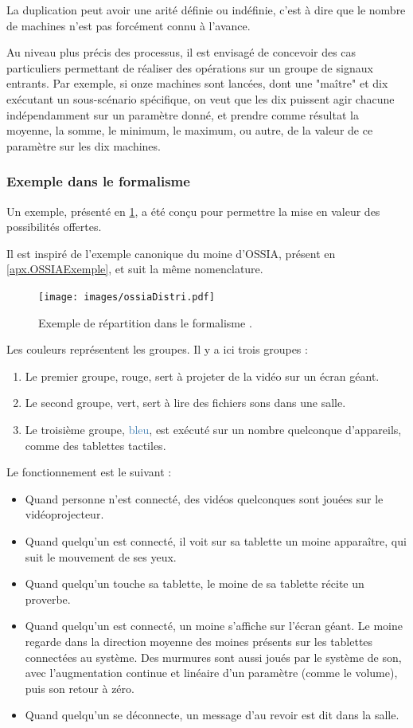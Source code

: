 La duplication peut avoir une arité définie ou indéfinie, c'est à dire que le nombre de machines n'est pas forcément connu à l'avance.

Au niveau plus précis des processus, il est envisagé de concevoir des cas particuliers permettant de réaliser des opérations sur un groupe de signaux entrants. Par exemple, si onze machines sont lancées, dont une "maître" et dix exécutant un sous-scénario spécifique, on veut que les dix puissent agir chacune indépendamment sur un paramètre donné, et prendre comme résultat la moyenne, la somme, le minimum, le maximum, ou autre, de la valeur de ce paramètre sur les dix machines.

\subsubsection{Exemple dans le formalisme}
Un exemple, présenté en \cref{fig.RepartOSSIA}, a été conçu pour permettre la mise en valeur des possibilités offertes.

Il est inspiré de l'exemple canonique du moine d'\ac{OSSIA}, présent en \cref{apx.OSSIAExemple}, et suit la même nomenclature.

\begin{figure}[h]
	\centering
	\texttt{[image: images/ossiaDistri.pdf]}
	\caption{Exemple de répartition dans le formalisme .}
	\label{fig.RepartOSSIA}
\end{figure}

Les couleurs représentent les groupes.
Il y a ici trois groupes : 

\begin{enumerate}
	\item Le premier groupe, \textcolor{BrickRed}{rouge}, sert à projeter de la vidéo sur un écran géant.
	\item Le second groupe, \textcolor{OliveGreen}{vert}, sert à lire des fichiers sons dans une salle.
	\item Le troisième groupe, \textcolor{SteelBlue}{bleu}, est exécuté sur un nombre quelconque d'appareils, comme des tablettes tactiles.  
\end{enumerate}

Le fonctionnement est le suivant : 
\begin{itemize}
	\item Quand personne n'est connecté, des vidéos quelconques sont jouées sur le vidéoprojecteur.
	\item Quand quelqu'un est connecté, il voit sur sa tablette un moine apparaître, qui suit le mouvement de ses yeux.
	\item Quand quelqu'un touche sa tablette, le moine de sa tablette récite un proverbe.
	\item Quand quelqu'un est connecté, un moine s'affiche sur l'écran géant. Le moine regarde dans la direction moyenne des moines présents sur les tablettes connectées au système. Des murmures sont aussi joués par le système de son, avec l'augmentation continue et linéaire d'un paramètre (comme le volume), puis son retour à zéro.
	\item Quand quelqu'un se déconnecte, un message d'au revoir est dit dans la salle.
\end{itemize}

